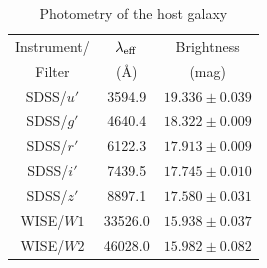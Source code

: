\documentclass[twocolumn]{aastex63}
\begin{document}
\begin{CJK*}{UTF8}{gbsn}
\begin{table}
	\centering
	\caption{Photometry of the host galaxy}\label{tab:host_phot}
	\begin{tabular}{ccc}
		\toprule
		Instrument/	    & $\lambda_{\rm eff}$   & Brightness		\\
		Filter          & (\AA)                 & (mag)             \\
		\midrule
		SDSS/$u'$ 		& 3594.9  & $ 19.336	 \pm 0.039$	\\
		SDSS/$g'$ 		& 4640.4  & $ 18.322 \pm 0.009$	\\
		SDSS/$r'$ 		& 6122.3  & $ 17.913	 \pm 0.009 $	 \\
		SDSS/$i'$ 		& 7439.5     &$ 17.745  \pm 0.010$\\
		SDSS/$z'$ 		& 8897.1     &$ 17.580 \pm 0.031$\\
		 WISE/$W1$ 		& 33526.0    &$ 15.938 \pm 0.037$\\
		  WISE/$W2$   & 46028.0    &$ 15.982 \pm  0.082$\\
		\bottomrule
	\end{tabular}
\end{table}

{}


\end{CJK*}
\end{document}
